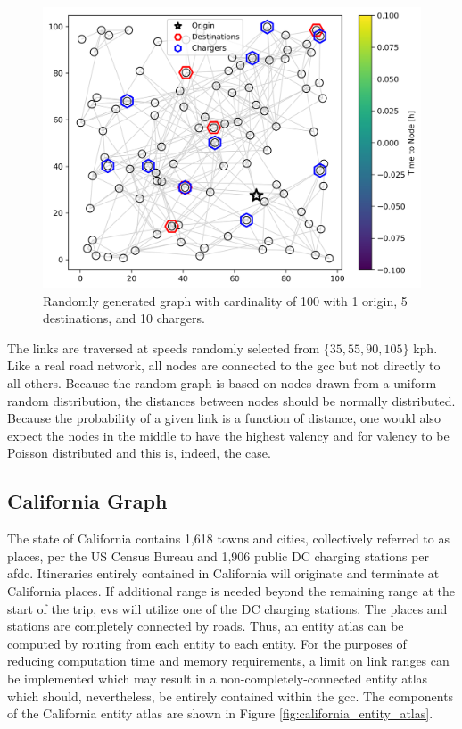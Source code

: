 \documentclass[12pt]{article}
\begin{document}
\begin{figure}[H]
	\centering
	\includegraphics[width = \linewidth * 2 / 3]{figs/random_graph.png}
	\caption{Randomly generated graph with cardinality of 100 with 1 origin, 5 destinations, and 10 chargers.}
	\label{fig:random_graph}
\end{figure}

The links are traversed at speeds randomly selected from $\{35, 55, 90, 105\}$ kph. Like a real road network, all nodes are connected to the \gls{gcc} but not directly to all others. Because the random graph is based on nodes drawn from a uniform random distribution, the distances between nodes should be normally distributed. Because the probability of a given link is a function of distance, one would also expect the nodes in the middle to have the highest valency and for valency to be Poisson distributed and this is, indeed, the case.

\subsection*{California Graph}

The state of California contains 1,618 towns and cities, collectively referred to as places, per the US Census Bureau and 1,906 public DC charging stations per \gls{afdc}. Itineraries entirely contained in California will originate and terminate at California places. If additional range is needed beyond the remaining range at the start of the trip, \glspl{ev} will utilize one of the DC charging stations. The places and stations are completely connected by roads. Thus, an entity atlas can be computed by routing from each entity to each entity. For the purposes of reducing computation time and memory requirements, a limit on link ranges can be implemented which may result in a non-completely-connected entity atlas which should, nevertheless, be entirely contained within the \gls{gcc}. The components of the California entity atlas are shown in Figure \ref{fig:california_entity_atlas}.
\end{document}
